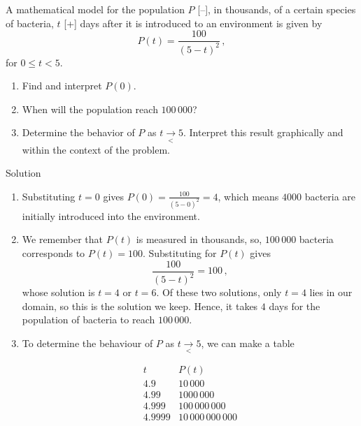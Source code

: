 \begin{example}
  A mathematical model for the population $P$ [--], in thousands, of a certain species of bacteria, $t$ [+] days after it is introduced to an environment is given by 
	$$P(t) = \frac{100}{(5-t)^{2}}\,,$$
for $0 \leq t < 5$.

\begin{enumerate}

\item  Find and interpret $P(0)$.

\item  When will the population reach $100\,000$?

\item  Determine the behavior of $P$ as $t \underset{<}{\rightarrow}  5$.  Interpret this result graphically and within the context of the problem. 

\end{enumerate}


Solution 

\begin{enumerate}

\item  Substituting $t=0$ gives $P(0) = \frac{100}{(5-0)^2} = 4$, which means $4000$ bacteria are initially introduced into the environment.

\item   We remember that $P(t)$ is measured in thousands, so, $100\,000$ bacteria corresponds to $P(t) = 100$.  Substituting for $P(t)$ gives $$\frac{100}{(5-t)^2} = 100\,,$$
whose solution is $t = 4$ or $t=6$.  Of these two solutions, only $t=4$ lies in our domain, so this is the solution we keep.  Hence, it takes $4$ days for the population of bacteria to reach $100\,000$.

\item To determine the behaviour of $P$ as $t\underset{<}{\rightarrow} 5$, we can make a table

\renewcommand{\arraystretch}{1.25}
\[\begin{array}{r|c}  

  t & P(t)  \\ \hline\hline
 4.9 & 10\,000  \\  
 4.99 & 1000\,000  \\  
 4.999 &  100\,000\,000  \\  
  4.9999 & 10\,000\,000\,000  \\  
  \end{array}\]
  \renewcommand{\arraystretch}{1}


\end{enumerate}
\end{example}
